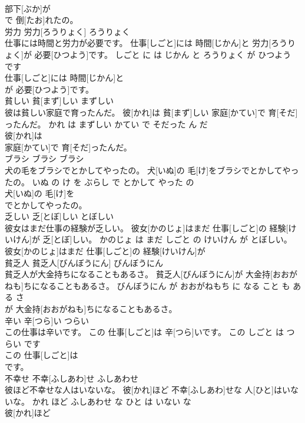 \documentclass[8pt]{extreport}
\begin{document}
\begin{CJK}{UTF8}{min}
\\	部下[ぶか]が
\\	で 倒[たお]れたの。			
\\	労力	労力[ろうりょく]	ろうりょく	
\\	仕事には時間と労力が必要です。	仕事[しごと]には 時間[じかん]と 労力[ろうりょく]が 必要[ひつよう]です。	しごと に は じかん と ろうりょく が ひつよう です	
\\	仕事[しごと]には 時間[じかん]と
\\	が 必要[ひつよう]です。			
\\	貧しい	貧[まず]しい	まずしい	
\\	彼は貧しい家庭で育ったんだ。	彼[かれ]は 貧[まず]しい 家庭[かてい]で 育[そだ]ったんだ。	かれ は まずしい かてい で そだった ん だ	
\\	彼[かれ]は
\\	家庭[かてい]で 育[そだ]ったんだ。			
\\	ブラシ	ブラシ	ブラシ	
\\	犬の毛をブラシでとかしてやったの。	犬[いぬ]の 毛[け]をブラシでとかしてやったの。	いぬ の け を ぶらし で とかして やった の	
\\	犬[いぬ]の 毛[け]を
\\	でとかしてやったの。			
\\	乏しい	乏[とぼ]しい	とぼしい	
\\	彼女はまだ仕事の経験が乏しい。	彼女[かのじょ]はまだ 仕事[しごと]の 経験[けいけん]が 乏[とぼ]しい。	かのじょ は まだ しごと の けいけん が とぼしい。	
\\	彼女[かのじょ]はまだ 仕事[しごと]の 経験[けいけん]が
\\	貧乏人	貧乏人[びんぼうにん]	びんぼうにん	
\\	貧乏人が大金持ちになることもあるさ。	貧乏人[びんぼうにん]が 大金持[おおがねも]ちになることもあるさ。	びんぼうにん が おおがねもち に なる こと も ある さ	
\\	が 大金持[おおがねも]ちになることもあるさ。			
\\	辛い	辛[つら]い	つらい	
\\	この仕事は辛いです。	この 仕事[しごと]は 辛[つら]いです。	この しごと は つらい です	
\\	この 仕事[しごと]は
\\	です。			
\\	不幸せ	不幸[ふしあわ]せ	ふしあわせ	
\\	彼ほど不幸せな人はいないな。	彼[かれ]ほど 不幸[ふしあわ]せな 人[ひと]はいないな。	かれ ほど ふしあわせ な ひと は いない な	
\\	彼[かれ]ほど

\end{CJK}
\end{document}
